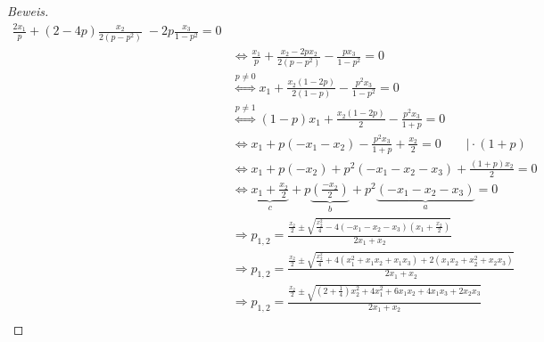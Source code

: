 \documentclass[a4paper]{article}
\begin{document}
\begin{proof}[Beweis]
\begin{align*}
				\frac{ 2 x_1 }{ p } +
				\left(
					2 - 4p
				\right) 
				\frac{ x_2 }{ 2 (p - p ^2) }
				\; - 2p \frac{ x_3 }{ 1 - p ^2 } = 0 \\
				   & \Leftrightarrow \frac{ x_1 }{ p }
				   + \frac{ x_2 - 2p x_2 }{ 2(p - p ^2) }
				   - \frac{ p x_3 }{ 1 - p ^2 } = 0 \\
				   & \overset{p \neq 0} \Longleftrightarrow 
				   x_1 + \frac{ x_2 (1 - 2p) }{ 2 (1- p) }
				   - \frac{ p ^2 x_3 }{ 1 - p ^2 } = 0 \\
				   & \overset{p \neq 1} \Longleftrightarrow 
				   (1 - p) x_1 + \frac{ x_2 (1 - 2p) }{ 2 }
				   - \frac{ p ^2 x_3 }{ 1 + p } = 0 \\
				   & \Leftrightarrow x_1 + p \left(
				   		- x_1 - x_2 
				   \right) - \frac{ p ^2 x_3 }{ 1 + p }
				   + \frac{ x_2 }{ 2 } = 0 \qquad \big \vert \cdot (1+p) \\
				   & \Leftrightarrow x_1 + p \left(
				   		- x_2 
				   \right)
				   + p ^2 \left(
				   		- x_1 - x_2 - x_3
				   \right)
				   + \frac{ (1+p) x_2 }{ 2 } = 0 \\
				   & \Leftrightarrow 
				   \underbrace{ x_1 + \frac{ x_2 }{ 2 } }_{ c } 
				   + p \underbrace{ \left(
					   \frac{ - x_2 }{ 2 } 
				   \right) }_{ b }
					+ p ^2 
				   \underbrace{ 
					   \left(
							- x_1 - x_2 - x_3
					   \right)
				   }_{ a } 
				   = 0 \\
				   & \Rightarrow
				   p_{1,2} = \frac{ 
					   \frac{ x_2 }{ 2 } \pm \sqrt{
						   \frac{ x_2 ^2 }{ 4 } - 4 \left(
						   	- x_1 - x_2 - x_3
						   \right) \left(
						   	x_1 + \frac{ x_2 }{ 2 }
						   \right) 
					   }
					   }{ 
					   2 x_1 + x_2
				   } \\
				   & \Rightarrow
				   p_{1,2} = \frac{ 
					   \frac{ x_2 }{ 2 } \pm \sqrt{
						   \frac{ x_2 ^2 }{ 4 } + 4 \left(
							   x_1 ^2 + x_1 x_2 + x_1 x_3
							   \right) 
							   + 2
							   \left(
								   x_1 x_2 + x_2 ^2 + x_2 x_3
						   \right) 
					   }
					   }{ 
					   2 x_1 + x_2
				   } \\
				   & \Rightarrow
				   p_{1,2} = \frac{ 
					   \frac{ x_2 }{ 2 } \pm \sqrt{
						   (2 + \frac{ 1 }{ 4 }) x_2 ^2
						   + 4 x_1 ^2 + 6 x_1 x_2 
						   + 4 x_1 x_3 + 2 x_2 x_3
					   }
					   }{ 
					   2 x_1 + x_2
				   } \\
		\end{align*}
	\end{proof}
\end{document}
